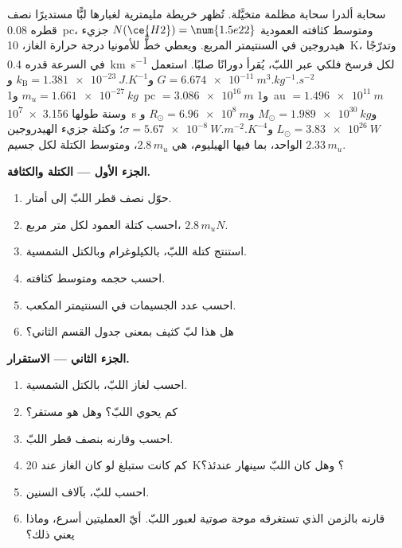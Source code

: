 \begin{problem}
\label{pb:b2:ism-star-formation:1}
سحابة ألدرا سحابة مظلمة متخيَّلة. تُظهر خريطة مليمترية لغبارها
لبًّا مستديرًا نصف قطره \qty{0.08}{pc}، ومتوسط كثافته العمودية
$N(\ce{H2}) = \num{1.5e22}$ جزيء هيدروجين في السنتيمتر المربع. ويعطي
خطٌّ للأمونيا درجة حرارة الغاز، \qty{10}{K}، وتدرّجًا في السرعة
قدره \qty{0.4}{km.s^{-1}} لكل فرسخ فلكي عبر اللبّ، يُقرأ دورانًا
صلبًا. استعمل $G = \qty{6.674e-11}{m^3.kg^{-1}.s^{-2}}$
و$k_{\mathrm B} = \qty{1.381e-23}{J.K^{-1}}$ و$m_u = \qty{1.661e-27}{kg}$
و\qty{1}{pc} $= \qty{3.086e16}{m}$ و\qty{1}{au} $= \qty{1.496e11}{m}$ وسنة طولها
\qty{3.156e7}{s} و$M_\odot = \qty{1.989e30}{kg}$ و$R_\odot = \qty{6.96e8}{m}$
و$L_\odot = \qty{3.83e26}{W}$ و$\sigma = \qty{5.67e-8}{W.m^{-2}.K^{-4}}$؛ وكتلة
جزيء الهيدروجين الواحد، بما فيها الهيليوم، هي $2.8\,m_u$، ومتوسط الكتلة
لكل جسيم $2.33\,m_u$.

\medskip
\noindent\textbf{الجزء الأول --- الكتلة والكثافة.}
\begin{enumerate}
  \item حوّل نصف قطر اللبّ إلى أمتار.
  \item احسب كتلة العمود لكل متر مربع، $2.8\,m_u N$.
  \item استنتج كتلة اللبّ، بالكيلوغرام وبالكتل الشمسية.
  \item احسب حجمه ومتوسط كثافته.
  \item احسب عدد الجسيمات في السنتيمتر المكعب.
  \item هل هذا لبّ كثيف بمعنى جدول القسم الثاني؟
\end{enumerate}

\noindent\textbf{الجزء الثاني --- الاستقرار.}
\begin{enumerate}[resume]
  \item احسب  لغاز اللبّ، بالكتل الشمسية.
  \item كم  يحوي اللبّ؟ وهل هو مستقر؟
  \item احسب  وقارنه بنصف قطر اللبّ.
  \item كم كانت ستبلغ  لو كان الغاز عند \qty{20}{K}؟ وهل كان
        اللبّ سينهار عندئذ؟
  \item احسب  للبّ، بآلاف السنين.
  \item قارنه بالزمن الذي تستغرقه موجة صوتية لعبور اللبّ. أيّ
        العمليتين أسرع، وماذا يعني ذلك؟
\end{enumerate}


\end{problem}
